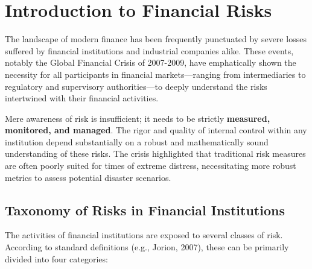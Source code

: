 \chapter{Introduction to Financial Risks}

The landscape of modern finance has been frequently punctuated by severe losses suffered by financial institutions and industrial companies alike. These events, notably the Global Financial Crisis of 2007-2009, have emphatically shown the necessity for all participants in financial markets—ranging from intermediaries to regulatory and supervisory authorities—to deeply understand the risks intertwined with their financial activities. 

Mere awareness of risk is insufficient; it needs to be strictly \textbf{measured, monitored, and managed}. The rigor and quality of internal control within any institution depend substantially on a robust and mathematically sound understanding of these risks. The crisis highlighted that traditional risk measures are often poorly suited for times of extreme distress, necessitating more robust metrics to assess potential disaster scenarios.

\section{Taxonomy of Risks in Financial Institutions}

The activities of financial institutions are exposed to several classes of risk. According to standard definitions (e.g., Jorion, 2007), these can be primarily divided into four categories:

